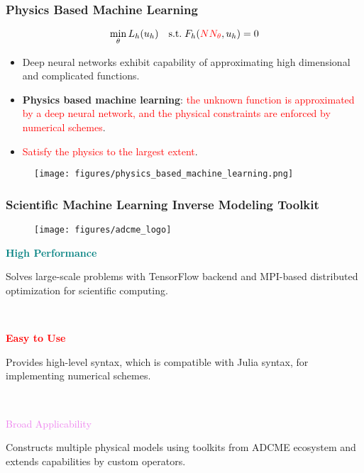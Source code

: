 \documentclass[usenames,dvipsnames]{beamer}
\begin{document}
\begin{frame}
	\frametitle{Physics Based Machine Learning}
	$$\min_{\theta} L_h(u_h) \quad \mathrm{s.t.}\;F_h(\textcolor{red}{NN_\theta}, u_h) = 0$$
	\vspace{-0.5cm}
	\begin{itemize}
		\item Deep neural networks exhibit capability of approximating high dimensional and complicated functions. 
		\item \textbf{Physics based machine learning}: \textcolor{red}{the unknown function is approximated by a deep neural network, and the physical constraints are enforced by numerical schemes}.
		\item \textcolor{red}{Satisfy the physics to the largest extent}.
	\end{itemize}
	\begin{figure}[hbt]
  \texttt{[image: figures/physics\_based\_machine\_learning.png]}
\end{figure}
\end{frame}


\begin{frame}
	\frametitle{Scientific Machine Learning Inverse Modeling Toolkit}

	
		\begin{figure}[hbt]
		\centering
  \texttt{[image: figures/adcme\_logo]}
\end{figure}

\begin{minipage}[t]{0.33\textwidth}
	\begin{center}
\textcolor{teal}{\textbf{High Performance}}		
	\end{center}

	
	Solves large-scale problems with TensorFlow backend and MPI-based distributed optimization for scientific computing. 
\end{minipage}~
\begin{minipage}[t]{0.33\textwidth}

\begin{center}
\textcolor{red}{\textbf{Easy to Use}}
	\end{center}

Provides high-level syntax, which is compatible with Julia syntax, for implementing numerical schemes. 
\end{minipage}~
\begin{minipage}[t]{0.33\textwidth}

\begin{center}
\textcolor{violet}{Broad Applicability}
	\end{center}
	
	
Constructs multiple physical models using toolkits from ADCME ecosystem and extends capabilities by custom operators. 
\end{minipage}
\end{frame}
\vspace{-1.0cm}
\end{document}
